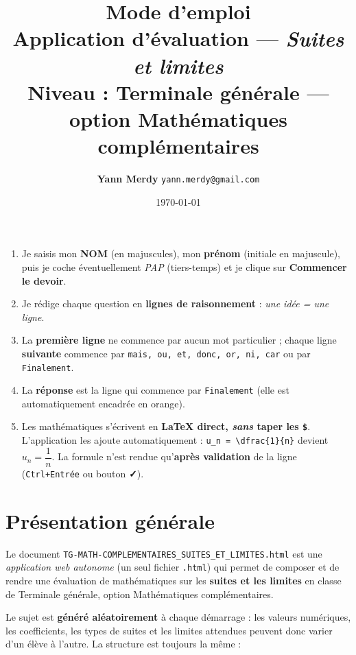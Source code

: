 \documentclass[11pt,a4paper]{article}
\title{\vspace{-1.2cm}\textbf{\color{bleufonce}Mode d'emploi}\\[2pt]
       \large Application d'évaluation — \emph{Suites et limites}\\
       \normalsize Niveau : Terminale générale — option Mathématiques complémentaires}
\author{\textbf{Yann Merdy} \quad\texttt{\small yann.merdy@gmail.com}}
\date{\today}
\begin{document}
\maketitle
\thispagestyle{fancy}

\begin{retenir}
\begin{enumerate}
  \item Je saisis mon \textbf{NOM} (en majuscules), mon \textbf{prénom}
        (initiale en majuscule), puis je coche éventuellement \emph{PAP}
        (tiers-temps) et je clique sur \textbf{Commencer le devoir}.
  \item Je rédige chaque question en \textbf{lignes de raisonnement} :
        \emph{une idée = une ligne}.
  \item La \textbf{première ligne} ne commence par aucun mot particulier ;
        chaque ligne \textbf{suivante} commence par \texttt{mais, ou, et, donc, or, ni, car}
        ou par \texttt{Finalement}.
  \item La \textbf{réponse} est la ligne qui commence par \texttt{Finalement}
        (elle est automatiquement encadrée en orange).
  \item Les mathématiques s'écrivent en \textbf{LaTeX direct, \emph{sans}
        taper les \texttt{\$}}. L'application les ajoute automatiquement :
        \verb|u_n = \dfrac{1}{n}| devient $u_n = \dfrac{1}{n}$.
        La formule n'est rendue qu'\textbf{après validation} de la ligne
        (\texttt{Ctrl+Entrée} ou bouton \textbf{✓}).
\end{enumerate}
\end{retenir}

\tableofcontents
\newpage

\section{Présentation générale}

Le document \texttt{TG-MATH-COMPLEMENTAIRES\_SUITES\_ET\_LIMITES.html} est une
\emph{application web autonome} (un seul fichier \texttt{.html}) qui permet de
composer et de rendre une évaluation de mathématiques sur les \textbf{suites et
les limites} en classe de Terminale générale, option Mathématiques complémentaires.

Le sujet est \textbf{généré aléatoirement} à chaque démarrage : les valeurs
numériques, les coefficients, les types de suites et les limites attendues
peuvent donc varier d'un élève à l'autre. La structure est toujours la même :
\end{document}
